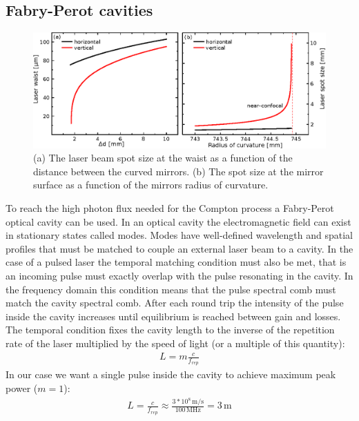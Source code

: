 \subsection{Fabry-Perot cavities}
\begin{figure}
	\centering
	\includegraphics[width=0.9\linewidth]{images/waistspot.eps}
	\caption{(a) The laser beam spot size at the waist as a function of the distance between the curved mirrors. (b) The spot size at the mirror surface as a function of the mirrors radius of curvature.}
	\label{fig:waistspot}
\end{figure}
To reach the high photon flux needed for the Compton process a Fabry-Perot optical cavity can be used.
In an optical cavity the electromagnetic field can exist in stationary states called modes. Modes have well-defined wavelength and spatial profiles that must be matched to couple an external laser beam to a cavity. In the case of a pulsed laser the temporal matching condition must also be met, that is an incoming pulse must exactly overlap with the pulse resonating in the cavity. In the frequency domain this condition means that the pulse spectral comb must match the cavity spectral comb. After each round trip the intensity of the pulse inside the cavity increases until equilibrium is reached between gain and losses. The temporal condition fixes the cavity length to the inverse of the repetition rate of the laser multiplied by the speed of light (or a multiple of this quantity):
\begin{align}
L = m \frac{c}{f_{rep}}
\end{align}
In our case we want a single pulse inside the cavity to achieve maximum peak power ($m=1$):
\begin{align}
L = \frac{c}{f_{rep}} \approx \frac{3*10^8\,\mathrm{m/s}}{100\,\mathrm{MHz}} = 3\,\mathrm{m}
\end{align}
